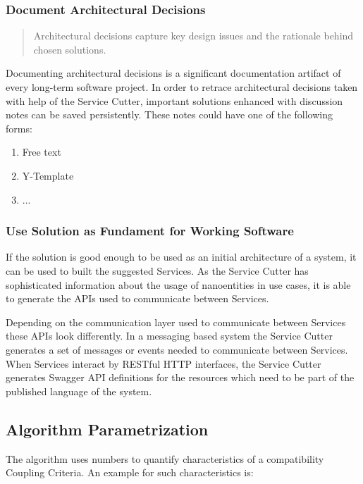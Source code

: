 \subsubsection{Document Architectural Decisions}

\begin{quote}
	Architectural decisions capture key design issues and the rationale behind chosen solutions.\cite{zioAD}
\end{quote}

Documenting architectural decisions is a significant documentation artifact of every long-term software project. In order to retrace architectural decisions taken with help of the Service Cutter, important solutions enhanced with discussion notes can be saved persistently. These notes could have one of the following forms:

\begin{enumerate}
	\item Free text
	\item Y-Template\cite{y-template}
	\item ...
\end{enumerate}

\subsubsection{Use Solution as Fundament for Working Software}

If the solution is good enough to be used as an initial architecture of a system, it can be used to built the suggested Services. As the Service Cutter has sophisticated information about the usage of nanoentities in use cases, it is able to generate the APIs used to communicate between Services. 

Depending on the communication layer used to communicate between Services these APIs look differently. In a messaging based system the Service Cutter generates a set of messages or events needed to communicate between Services. When Services interact by RESTful HTTP interfaces, the Service Cutter generates Swagger\cite{swagger} API definitions for the resources which need to be part of the published language\cite[p.375]{evans2003domain} of the system. 


\subsection{Algorithm Parametrization}

The algorithm uses numbers to quantify characteristics of a compatibility Coupling Criteria. An example for such characteristics is:

